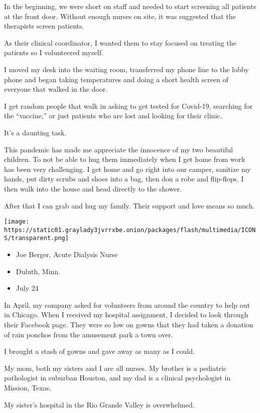 In the beginning, we were short on staff and needed to start screening
all patients at the front door. Without enough nurses on site, it was
suggested that the therapists screen patients.

As their clinical coordinator, I wanted them to stay focused on treating
the patients so I volunteered myself.

I moved my desk into the waiting room, transferred my phone line to the
lobby phone and began taking temperatures and doing a short health
screen of everyone that walked in the door.

I get random people that walk in asking to get tested for Covid-19,
searching for the ``vaccine,'' or just patients who are lost and looking
for their clinic.

It's a daunting task.

This pandemic has made me appreciate the innocence of my two beautiful
children. To not be able to hug them immediately when I get home from
work has been very challenging. I get home and go right into our camper,
sanitize my hands, put dirty scrubs and shoes into a bag, then don a
robe and flip-flops. I then walk into the house and head directly to the
shower.

After that I can grab and hug my family. Their support and love means so
much.

\texttt{[image: https://static01.graylady3jvrrxbe.onion/packages/flash/multimedia/ICONS/transparent.png]}

\begin{itemize}
\tightlist
\item
  Joe Berger, Acute Dialysis Nurse
\item
  Duluth, Minn.
\item
  July 24
\end{itemize}

In April, my company asked for volunteers from around the country to
help out in Chicago. When I received my hospital assignment, I decided
to look through their Facebook page. They were so low on gowns that they
had taken a donation of rain ponchos from the amusement park a town
over.

I brought a stash of gowns and gave away as many as I could.

My mom, both my sisters and I are all nurses. My brother is a pediatric
pathologist in suburban Houston, and my dad is a clinical psychologist
in Mission, Texas.

My sister's hospital in the Rio Grande Valley is overwhelmed.

